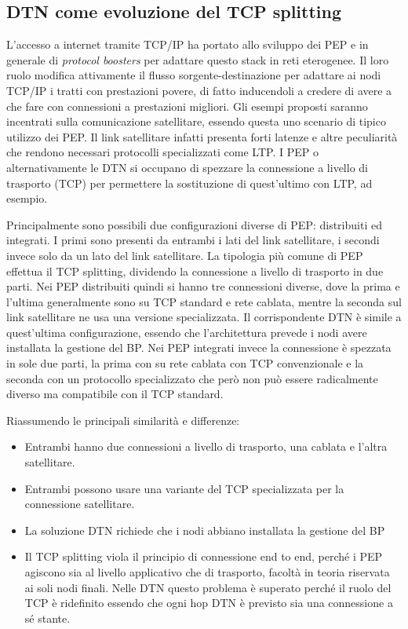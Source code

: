 \documentclass[a4paper]{article}
\begin{document}
		
		\subsection{DTN come evoluzione del TCP splitting}
		L'accesso a internet tramite TCP/IP ha portato allo sviluppo dei PEP e in generale di {\it protocol boosters } per adattare questo stack in reti eterogenee. Il loro ruolo modifica attivamente il flusso sorgente-destinazione per adattare ai nodi TCP/IP i tratti con prestazioni povere, di fatto inducendoli a credere di avere a che fare con connessioni a prestazioni migliori. Gli esempi proposti saranno incentrati sulla comunicazione satellitare, essendo questa uno scenario di tipico utilizzo dei PEP. Il link satellitare infatti presenta forti latenze e altre peculiarità che rendono necessari protocolli specializzati come LTP. I PEP o alternativamente le DTN si occupano di spezzare la connessione a livello di trasporto (TCP) per permettere la sostituzione di quest'ultimo con LTP, ad esempio. 
		
		Principalmente sono possibili due configurazioni diverse di PEP: distribuiti ed integrati. I primi sono presenti da entrambi i lati del link satellitare, i secondi invece solo da un lato del link satellitare. 
		La tipologia più comune di PEP effettua il TCP splitting, dividendo la connessione a livello di trasporto in due parti. Nei PEP distribuiti quindi si hanno tre connessioni diverse, dove la prima e l'ultima generalmente sono su TCP standard e rete cablata, mentre la seconda sul link satellitare ne usa una versione specializzata.
		Il corrispondente DTN è simile a quest'ultima configurazione, essendo che l'architettura prevede i nodi avere installata la gestione del BP.
		Nei PEP integrati invece la connessione è spezzata in sole due parti, la prima con su rete cablata con TCP convenzionale e la seconda con un protocollo specializzato che però non può essere radicalmente diverso ma compatibile con il TCP standard.
		
		Riassumendo le principali similarità e differenze:
		\begin{itemize}
			\item Entrambi hanno due connessioni a livello di trasporto, una cablata e l'altra satellitare.
			\item Entrambi possono usare una variante del TCP specializzata per la connessione satellitare.
			\item La soluzione DTN richiede che i nodi abbiano installata la gestione del BP
			\item Il TCP splitting viola il principio di connessione end to end, perché i PEP agiscono sia al livello applicativo che di trasporto, facoltà in teoria riservata ai soli nodi finali. Nelle DTN questo problema è superato perché il ruolo del TCP è ridefinito essendo che ogni hop DTN è previsto sia una connessione a sé stante.
 		\end{itemize}
		
\end{document}
